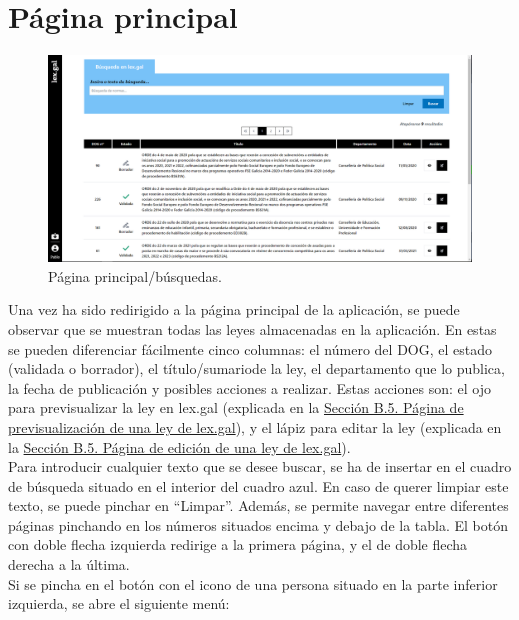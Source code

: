 \section{Página principal}
\label{PPrincipal}

\begin{figure}[H]
\centerline{\includegraphics[width=15cm]{figuras/manualUsuario/Principal.PNG}}
\caption{Página principal/búsquedas.}
\label{enlacePPrincipal}
\end{figure}

Una vez ha sido redirigido a la página principal de la aplicación, se puede observar que se muestran todas las leyes almacenadas en la aplicación. En estas se pueden diferenciar fácilmente cinco columnas: el número del DOG, el estado (validada o borrador), el título/sumariode la ley, el departamento que lo publica, la fecha de publicación y posibles acciones a realizar. Estas acciones son: el ojo para previsualizar la ley en lex.gal (explicada en la \hyperref[PPrevisualizacionLexGal]{Sección B.5. Página de previsualización de una ley de lex.gal}), y el lápiz para editar la ley (explicada en la \hyperref[PEdicionLexGal]{Sección B.5. Página de edición de una ley de lex.gal}). 
\\

Para introducir cualquier texto que se desee buscar, se ha de insertar en el cuadro de búsqueda situado en el interior del cuadro azul. En caso de querer limpiar este texto, se puede pinchar en ``Limpar''. Además, se permite navegar entre diferentes páginas pinchando en los números situados encima y debajo de la tabla. El botón con doble flecha izquierda redirige a la primera página, y el de doble flecha derecha a la última.
\\

Si se pincha en el botón con el icono de una persona situado en la parte inferior izquierda, se abre el siguiente menú:

